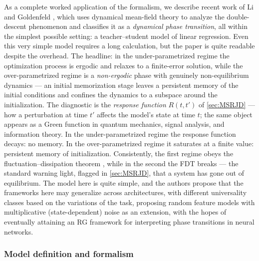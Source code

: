 \documentclass[11pt]{article}
\begin{document}
As a complete worked application of the formalism, we describe recent work of Li and Goldenfeld \cite{liBrokenErgodicityViolation2026}, which uses dynamical mean-field theory to analyze the double-descent phenomenon and classifies it as a \emph{dynamical phase transition}, all within the simplest possible setting: a teacher--student model of linear regression. Even this very simple model requires a long calculation, but the paper is quite readable despite the overhead. The headline: in the under-parametrized regime the optimization process is ergodic and relaxes to a finite-error solution, while the over-parametrized regime is a \emph{non-ergodic} phase with genuinely non-equilibrium dynamics --- an initial memorization stage leaves a persistent memory of the initial conditions and confines the dynamics to a subspace around the initialization.  The diagnostic is the \textit{response function} $R(t,t')$ of \cref{sec:MSRJD} --- how a perturbation at time $t'$ affects the model's state at time $t$; the same object appears as a Green function in quantum mechanics, signal analysis, and information theory. In the under-parametrized regime the response function decays: no memory. In the over-parametrized regime it saturates at a finite value: persistent memory of initialization. Consistently, the first regime obeys the fluctuation--dissipation theorem \cite{kuboStatisticalMechanicalTheoryIrreversible1957,kuboFluctuationdissipationTheorem1966,goldenfeldLecturesPhaseTransitions2018a}, while in the second the FDT breaks --- the standard warning light, flagged in \cref{sec:MSRJD}, that a system has gone out of equilibrium.  The model here is quite simple, and the authors propose that the frameworks here may generalize across architectures, with different universality classes based on the variations of the task, proposing random feature models with multiplicative (state-dependent) noise as an extension, with the hopes of eventually attaining an RG framework for interpreting phase transitions in neural networks.  
\subsubsection{Model definition and formalism}
\end{document}

